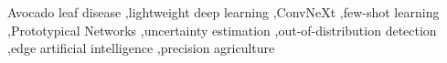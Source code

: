 \begin{frontmatter}
\begin{keyword}
Avocado leaf disease \sep lightweight deep learning \sep ConvNeXt \sep few-shot learning \sep Prototypical Networks \sep uncertainty estimation \sep out-of-distribution detection \sep edge artificial intelligence \sep precision agriculture
\end{keyword}

\end{frontmatter}
